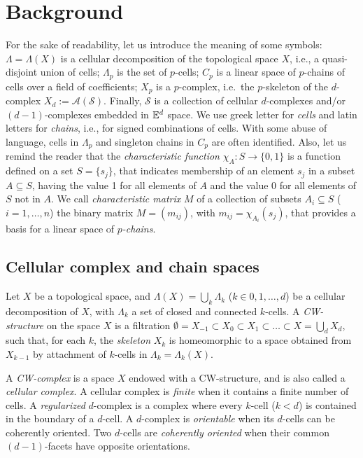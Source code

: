 \section{Background}\label{background}


For the sake of readability, let us introduce the meaning of some symbols: $\Lambda = \Lambda(X)$ {is a cellular decomposition of the topological space $X$, i.e., a quasi-disjoint union of cells}; $\Lambda_{p}$ is the set of $p$-cells; $C_p$ is a linear space of $p$-chains of cells over a {field of coefficients}; $X_p$ is a $p$-complex, i.e.~the $p$-skeleton of the  $d$-complex  $X_d := \mathcal{A}(\mathcal{S})$. Finally, $\mathcal{S}$ is a collection of cellular $d$-complexes and/or $(d-1)$-complexes embedded in $\mathbb{E}^d$ space. We use greek letter for \emph{cells} and latin letters for \emph{chains}, i.e., for signed combinations of cells.  With some abuse of language, cells in $\Lambda_p$ and singleton chains in $C_p$ are often identified.
Also, let us remind the reader that the \emph{characteristic function} $\chi_A: S\to\{0,1\}$ is a function defined on a set $S=\{s_j\}$, that indicates membership of an element $s_j$ in a subset $A\subseteq S$, having the value 1 for all elements of $A$ and the value 0 for all elements of $S$ not in $A$. 
We call \emph{characteristic matrix} $M$ of a collection of subsets $A_i\subseteq S$ ($i=1,\ldots,n$) the binary  matrix $M=(m_{ij})$, with $m_{ij} = \chi_{A_i}(s_j)$, that provides a basis for a linear space of \emph{$p$-chains}. 



\subsection{Cellular complex and chain spaces}
\label{sec:cells-chains}

Let $X$ be a topological space, and
$\Lambda(X) = \bigcup_k\Lambda_k$ ($k \in {0, 1,\ldots,d}$) be a
{cellular decomposition} of $X$, with $\Lambda_k$ a set of {closed} and connected $k$-cells. 
A \emph{CW-structure} on the space $X$ is a filtration
$\emptyset = X_{-1} \subset X_0 \subset X_1 \subset \ldots \subset X = \bigcup_d X_d$,
such that, for each $k$, the \emph{skeleton} $X_k$ is homeomorphic
to a space obtained from $X_{k-1}$ by attachment of $k$-cells in
$\Lambda_k = \Lambda_k(X)$.

A \emph{CW-complex} is a space $X$ endowed with a CW-structure, and is also
called a \emph{cellular complex}. A cellular complex is \emph{finite}
when it contains a finite number of cells. A \emph{regularized}
$d$-complex is a complex where 
every $k$-cell ($k < d$) is contained in the
boundary of a $d$-cell.
A $d$-complex is \emph{orientable} when its $d$-cells can be coherently oriented. Two $d$-cells are \emph{coherently oriented} when their common $(d-1)$-facets have opposite orientations. 

